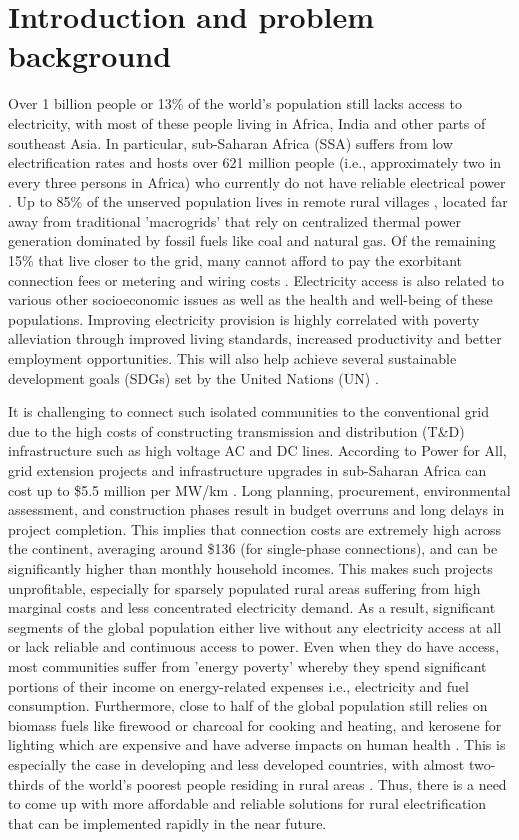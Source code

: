 \documentclass[final,3p,times]{elsarticle}
\begin{document}
\section{Introduction and problem background \label{sec:access}}

Over 1 billion people or 13\% of the world's population still lacks access to electricity, with most of these people living in Africa, India and other parts of southeast Asia. In particular, sub-Saharan Africa (SSA) suffers from low electrification rates and hosts over 621 million people (i.e., approximately two in every three persons in Africa) who currently do not have reliable electrical power \cite{SSA_decent}. Up to 85\% of the unserved population lives in remote rural villages \cite{quak_CBA}, located far away from traditional 'macrogrids' that rely on centralized thermal power generation dominated by fossil fuels like coal and natural gas. Of the remaining 15\% that live closer to the grid, many cannot afford to pay the exorbitant connection fees or metering and wiring costs \cite{quak_CBA}. Electricity access is also related to various other socioeconomic issues as well as the health and well-being of these populations. Improving electricity provision is highly correlated with poverty alleviation through improved living standards, increased productivity and better employment opportunities. This will also help achieve several sustainable development goals (SDGs) set by the United Nations (UN) \cite{SSA_decent}.

It is challenging to connect such isolated communities to the conventional grid due to the high costs of constructing transmission and distribution (T\&D) infrastructure such as high voltage AC and DC lines. According to Power for All, grid extension projects and infrastructure upgrades in sub-Saharan Africa can cost up to \$5.5 million per MW/km \cite{grid_gtm}. Long planning, procurement, environmental assessment, and construction phases result in budget overruns and long delays in project completion. This implies that connection costs are extremely high across the continent, averaging around \$136 (for single-phase connections), and can be significantly higher than monthly household incomes. This makes such projects unprofitable, especially for sparsely populated rural areas suffering from high marginal costs and less concentrated electricity demand. As a result, significant segments of the global population either live without any electricity access at all or lack reliable and continuous access to power. Even when they do have access, most communities suffer from 'energy poverty' whereby they spend significant portions of their income on energy-related expenses i.e., electricity and fuel consumption. Furthermore, close to half of the global population still relies on biomass fuels like firewood or charcoal for cooking and heating, and kerosene for lighting which are expensive and have adverse impacts on human health \cite{kammen}. This is especially the case in developing and less developed countries, with almost two-thirds of the world's poorest people residing in rural areas \cite{kammen}. Thus, there is a need to come up with more affordable and reliable solutions for rural electrification that can be implemented rapidly in the near future. 
\end{document}
